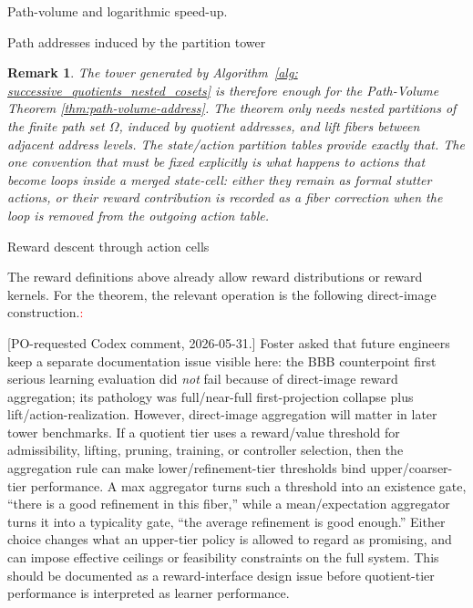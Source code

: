 \documentclass[11pt]{article}
\newtheorem{remark}[subsubsection]{Remark}
\begin{document}
\begin{section}{Path-volume and logarithmic speed-up.}
\begin{subsection}{Path addresses induced by the partition tower}
\begin{remark}
\normalfont
The tower generated by Algorithm~\ref{alg: successive_quotients_nested_cosets} is therefore enough for the Path-Volume Theorem \ref{thm:path-volume-address}. The theorem only needs nested partitions of the finite path set $\Omega$, induced by quotient addresses, and lift fibers between adjacent address levels. The state/action partition tables provide exactly that. The one convention that must be fixed explicitly is what happens to actions that become loops inside a merged state-cell: either they remain as formal stutter actions, or their reward contribution is recorded as a fiber correction when the loop is removed from the outgoing action table.
\end{remark}

\end{subsection}

\begin{subsection}{Reward descent through action cells}

The reward definitions above already allow reward distributions or reward kernels. For the theorem, the relevant operation is the following direct-image construction.\textcolor{red}{:}

{\color{blue}\textsf{[PO-requested Codex comment, 2026-05-31.] Foster asked that future engineers keep a separate documentation issue visible here: the BBB counterpoint first serious learning evaluation did \emph{not} fail because of direct-image reward aggregation; its pathology was full/near-full first-projection collapse plus lift/action-realization. However, direct-image aggregation will matter in later tower benchmarks. If a quotient tier uses a reward/value threshold for admissibility, lifting, pruning, training, or controller selection, then the aggregation rule can make lower/refinement-tier thresholds bind upper/coarser-tier performance. A max aggregator turns such a threshold into an existence gate, ``there is a good refinement in this fiber,'' while a mean/expectation aggregator turns it into a typicality gate, ``the average refinement is good enough.'' Either choice changes what an upper-tier policy is allowed to regard as promising, and can impose effective ceilings or feasibility constraints on the full system. This should be documented as a reward-interface design issue before quotient-tier performance is interpreted as learner performance.}}


\end{subsection}
\end{section}
\end{document}
